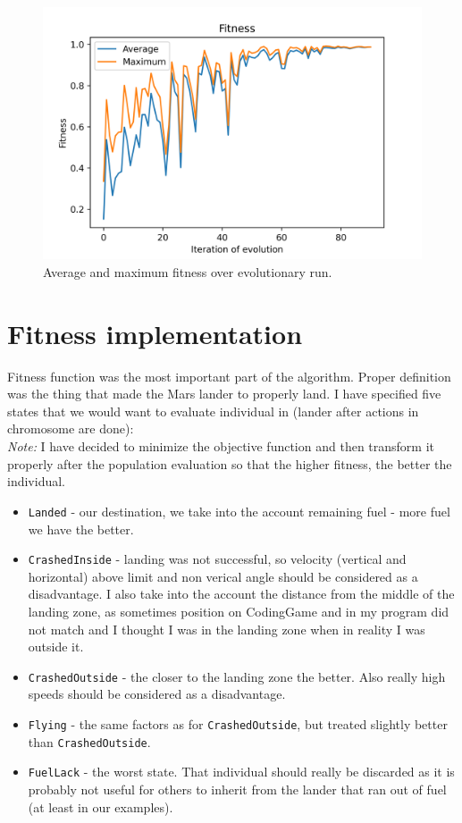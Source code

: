 \documentclass[11pt]{article}
\begin{document}
	\begin{figure}[h]
 	\centering
	\includegraphics[scale=1.0]{plots/plot} 	
	\caption{Average and maximum fitness over evolutionary run.}
 	\end{figure}
	
	\section{Fitness implementation}
	Fitness function was the most important part of the algorithm. Proper definition was the thing that made the Mars lander to properly land. I have specified five states that we would want to evaluate individual in (lander after actions in chromosome are done):\\
	
	\textit{Note:} I have decided to minimize the objective function and then transform it properly after the population evaluation so that the higher fitness, the better the individual.
		
	\begin{itemize}
		\item \texttt{Landed} - our destination, we take into the account remaining fuel - more fuel we have the better.
		\item \texttt{CrashedInside} - landing was not successful, so velocity (vertical and horizontal) above limit and non verical angle should be considered as a disadvantage. I also take into the account the distance from the middle of the landing zone, as sometimes position on CodingGame and in my program did not match and I thought I was in the landing zone when in reality I was outside it.
		\item \texttt{CrashedOutside} - the closer to the landing zone the better. Also really high speeds should be considered as a disadvantage.
		\item \texttt{Flying} - the same factors as for \texttt{CrashedOutside}, but treated slightly better than \texttt{CrashedOutside}.
		\item \texttt{FuelLack} - the worst state. That individual should really be discarded as it is probably not useful for others to inherit from the lander that ran out of fuel (at least in our examples).
	\end{itemize}
	
\end{document}
